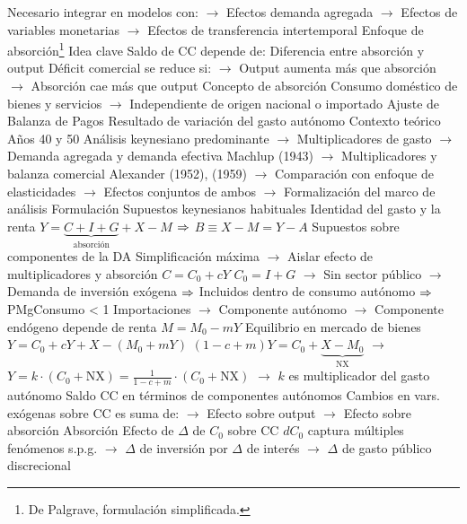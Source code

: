 \documentclass{nuevotema}
\begin{document}
\begin{esquemal}
				\4[] Necesario integrar en modelos con:
				\4[] $\to$ Efectos demanda agregada
				\4[] $\to$ Efectos de variables monetarias
				\4[] $\to$ Efectos de transferencia intertemporal
		\2 Enfoque de absorción\footnote{De Palgrave, formulación simplificada.}
			\3 Idea clave
				\4 Saldo de CC depende de:
				\4[] Diferencia entre absorción y output
				\4 Déficit comercial se reduce si:
				\4[] $\to$ Output aumenta más que absorción
				\4[] $\to$ Absorción cae más que output
				\4 Concepto de absorción
				\4[] Consumo doméstico de bienes y servicios
				\4[] $\to$ Independiente de origen nacional o importado
				\4 Ajuste de Balanza de Pagos
				\4[] Resultado de variación del gasto autónomo
				\4 Contexto teórico
				\4[] Años 40 y 50
				\4[] Análisis keynesiano predominante
				\4[] $\to$ Multiplicadores de gasto
				\4[] $\to$ Demanda agregada y demanda efectiva
				\4[] Machlup (1943)
				\4[] $\to$ Multiplicadores y balanza comercial
				\4[] Alexander (1952), (1959)
				\4[] $\to$ Comparación con enfoque de elasticidades
				\4[] $\to$ Efectos conjuntos de ambos
				\4[] $\to$ Formalización del marco de análisis
			\3 Formulación
				\4 Supuestos keynesianos habituales
				\4 Identidad del gasto y la renta
				\4[] $Y = \underbrace{C + I + G}_{\text{absorción}} + X - M$
				\4[] $\Rightarrow$ $B \equiv X-M = Y - A$
				\4 Supuestos sobre componentes de la DA
				\4[] Simplificación máxima
				\4[] $\to$ Aislar efecto de multiplicadores y absorción
				\4[] $C = C_0 + c Y$
				\4[] $C_0 = I + G$
				\4[] $\to$ Sin sector público
				\4[] $\to$ Demanda de inversión exógena
				\4[] $\Rightarrow$ Incluidos dentro de consumo autónomo
				\4[] $\Rightarrow$ PMgConsumo < 1
				\4[] Importaciones
				\4[] $\to$ Componente autónomo
				\4[] $\to$ Componente endógeno depende de renta
				\4[] $M = M_0 - mY$
				\4 Equilibrio en mercado de bienes
				\4[] $Y = C_0 + cY + X - (M_0 + mY)$
				\4[] $(1-c+m)Y = C_0 + \underbrace{X - M_0}_{\text{NX}}$
				\4[] $\to$ $Y=k \cdot (C_0 + \text{NX}) = \frac{1}{1-c+m} \cdot (C_0 + \text{NX})$
				\4[] $\to$ $k$ es multiplicador del gasto autónomo
				\4 Saldo CC en términos de componentes autónomos
				\4[] 
				\4 Cambios en vars. exógenas sobre CC es suma de:
				\4[] $\to$ Efecto sobre output
				\4[] $\to$ Efecto sobre absorción Absorción
				\4 Efecto de $\Delta$ de $C_0$ sobre CC
				\4[] $d C_0$ captura múltiples fenómenos s.p.g.
				\4[] $\to$ $\Delta$ de inversión por $\Delta$ de interés
				\4[] $\to$ $\Delta$ de gasto público discrecional

\end{esquemal}
\end{document}
